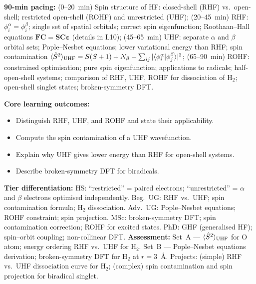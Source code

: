 \documentclass[11pt,a4paper]{article}
\begin{document}
\medskip

\begin{tcolorbox}[chembox, title={Module~III.2 --- Lecture L06: Restricted and Unrestricted Methods}]
\textbf{90-min pacing:} (0--20~min) Spin structure of HF: closed-shell (RHF) vs.\ open-shell; restricted open-shell (ROHF) and unrestricted (UHF); (20--45~min) RHF: $\phi_i^\alpha=\phi_i^\beta$; single set of spatial orbitals; correct spin eigenfunction; Roothaan--Hall equations $\mathbf{F}\mathbf{C}=\mathbf{S}\mathbf{C}\boldsymbol\varepsilon$ (details in L10); (45--65~min) UHF: separate $\alpha$ and $\beta$ orbital sets; Pople--Nesbet equations; lower variational energy than RHF; spin contamination $\langle\hat{S}^2\rangle_{\rm UHF}=S(S+1)+N_\beta-\sum_{ij}|\langle\phi_i^\alpha|\phi_j^\beta\rangle|^2$; (65--90~min) ROHF: constrained optimisation; pure spin eigenfunction; applications to radicals; half-open-shell systems; comparison of RHF, UHF, ROHF for dissociation of H$_2$; open-shell singlet states; broken-symmetry DFT.

\medskip\textbf{Core learning outcomes:}
\begin{itemize}[leftmargin=1.4em,topsep=2pt,itemsep=1pt]
  \item Distinguish RHF, UHF, and ROHF and state their applicability.
  \item Compute the spin contamination of a UHF wavefunction.
  \item Explain why UHF gives lower energy than RHF for open-shell systems.
  \item Describe broken-symmetry DFT for biradicals.
\end{itemize}
\medskip\textbf{Tier differentiation:}
HS: ``restricted'' = paired electrons; ``unrestricted'' = $\alpha$ and $\beta$ electrons optimised independently.
Beg.\ UG: RHF vs.\ UHF; spin contamination formula; H$_2$ dissociation.
Adv.\ UG: Pople--Nesbet equations; ROHF constraint; spin projection.
MSc: broken-symmetry DFT; spin contamination correction; ROHF for excited states.
PhD: GHF (generalised HF); spin--orbit coupling; non-collinear DFT.
\medskip\textbf{Assessment:}
Set~A --- $\langle\hat{S}^2\rangle_{\rm UHF}$ for O atom; energy ordering RHF vs.\ UHF for H$_2$.
Set~B --- Pople--Nesbet equations derivation; broken-symmetry DFT for H$_2$ at $r=3$~\AA.
Projects: (simple) RHF vs.\ UHF dissociation curve for H$_2$; (complex) spin contamination and spin projection for biradical singlet.
\end{tcolorbox}

\medskip
\end{document}
